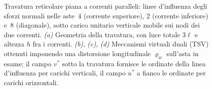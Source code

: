 \begin{figure}[htbp]
{%
			}
			\caption{Travatura reticolare piana a correnti paralleli: linee d'influenza
				degli sforzi normali nelle aste~$4$ (corrente superiore),
				$2$ (corrente inferiore) e~$8$ (diagonale), sotto carico unitario
				verticale mobile sui nodi dei due correnti.
				\emph{(a)} Geometria della travatura, con luce totale $3\ell$ e altezza
				$h$ fra i correnti.
				\emph{(b)}, \emph{(c)}, \emph{(d)} Meccanismi virtuali duali (TSV)
				ottenuti imponendo una distorsione longitudinale $\varrho_w$ sull'asta
				in esame; il campo $v^*$ sotto la travatura fornisce le ordinate della
				linea d'influenza per carichi verticali, il campo $u^*$ a fianco le
				ordinate per carichi orizzontali.}
			\label{fig:LI_reticolare}
		\end{figure}
